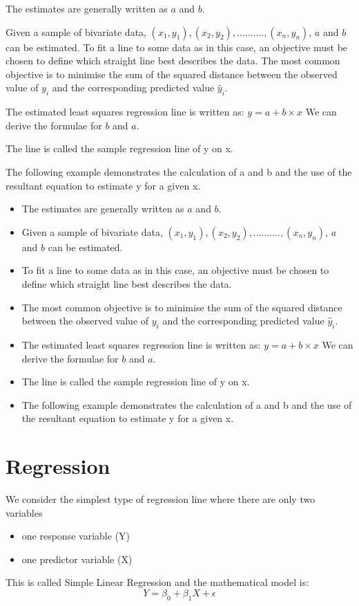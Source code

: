 \documentclass[]{report}
\begin{document}
The estimates are generally written as $a$ and $b$.

Given a sample of bivariate data, $(x_1,y_1),(x_2,y_2) ,.........., (x_n,y_n)$, $a$ and $b$ can be
estimated. To fit a line to some data as in this case, an objective must be chosen to
define which straight line best describes the data. The most common objective is to
minimise the sum of the squared distance between the observed value of $y_i$
and the corresponding predicted value $\hat{y}_i$.

The estimated least squares regression line is written as:
$y = a + b\times x$
We can derive the formulae for $b$ and $a$.



The line is called the sample regression line of y on x.

The following example demonstrates the calculation of a and b and the use of the resultant
equation to estimate y for a given x.

\newpage


	
\begin{itemize}
\item 	The estimates are generally written as $a$ and $b$.
\item 	Given a sample of bivariate data, $(x_1,y_1),(x_2,y_2) ,.........., (x_n,y_n)$, $a$ and $b$ can be
	estimated. 
\item  To fit a line to some data as in this case, an objective must be chosen to
	define which straight line best describes the data. 
\item  The most common objective is to
	minimise the sum of the squared distance between the observed value of $y_i$
	and the corresponding predicted value $\hat{y}_i$.
\item 	The estimated least squares regression line is written as:
	$y = a + b\times x$
	We can derive the formulae for $b$ and $a$.
\item 	The line is called the sample regression line of y on x.
\item 	The following example demonstrates the calculation of a and b and the use of the resultant
	equation to estimate y for a given x.
\end{itemize}

	


\section{Regression}
We consider the simplest type of regression line where there are only two
variables
\begin{itemize}
	\item  one response variable (Y)
	\item one predictor variable (X)
\end{itemize}
This is called Simple Linear Regression and the mathematical model is:
\[ Y = \beta_0 + \beta_1X + \epsilon \]
\end{document}
